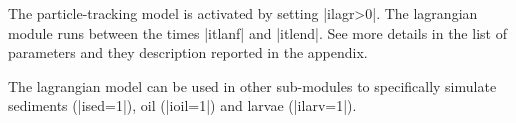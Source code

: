 The particle-tracking model is activated by setting |ilagr>0|.
The lagrangian module runs between the times |itlanf| and |itlend|.
See more details in the list of parameters and they description 
reported in the appendix.

The lagrangian model can be used in other sub-modules to specifically
simulate sediments (|ised=1|), oil (|ioil=1|) and larvae (|ilarv=1|).

